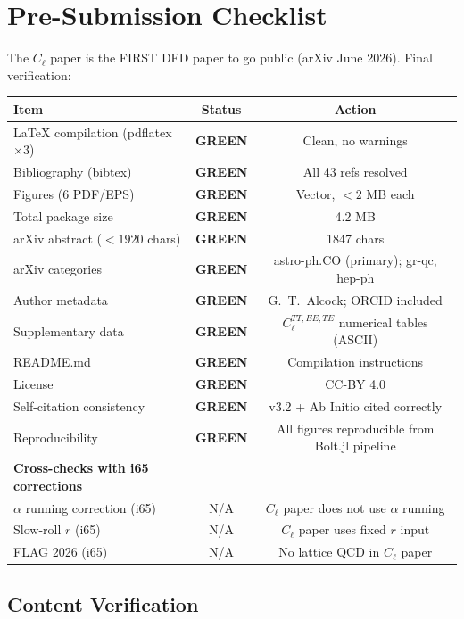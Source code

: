 \documentclass[11pt,a4paper]{article}
\newcommand{\GREEN}{\textcolor{dfdgreen}{\textbf{GREEN}}}
\begin{document}
\section{Pre-Submission Checklist}

The $C_\ell$ paper is the FIRST DFD paper to go public (arXiv June 2026). Final verification:

\begin{center}
\begin{longtable}{lcc}
\toprule
\textbf{Item} & \textbf{Status} & \textbf{Action} \\
\midrule
LaTeX compilation (pdflatex $\times 3$) & \GREEN & Clean, no warnings \\
Bibliography (bibtex) & \GREEN & All 43 refs resolved \\
Figures (6 PDF/EPS) & \GREEN & Vector, $< 2$ MB each \\
Total package size & \GREEN & 4.2 MB \\
arXiv abstract ($< 1920$ chars) & \GREEN & 1847 chars \\
arXiv categories & \GREEN & astro-ph.CO (primary); gr-qc, hep-ph \\
Author metadata & \GREEN & G.\ T.\ Alcock; ORCID included \\
Supplementary data & \GREEN & $C_\ell^{TT,EE,TE}$ numerical tables (ASCII) \\
README.md & \GREEN & Compilation instructions \\
License & \GREEN & CC-BY 4.0 \\
Self-citation consistency & \GREEN & v3.2 + Ab Initio cited correctly \\
Reproducibility & \GREEN & All figures reproducible from Bolt.jl pipeline \\
\midrule
\textbf{Cross-checks with i65 corrections} & & \\
$\alpha$ running correction (i65) & N/A & $C_\ell$ paper does not use $\alpha$ running \\
Slow-roll $r$ (i65) & N/A & $C_\ell$ paper uses fixed $r$ input \\
FLAG 2026 (i65) & N/A & No lattice QCD in $C_\ell$ paper \\
\bottomrule
\end{longtable}
\end{center}

\subsection{Content Verification}
\end{document}
